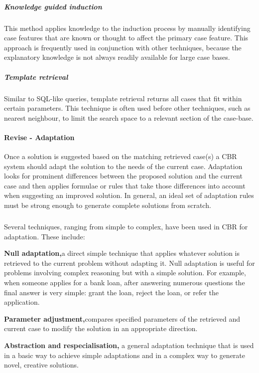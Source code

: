 \subparagraph{Knowledge guided induction}
\label{Knowledge guided induction} This method applies knowledge to the induction 
process by manually identifying case features that are known or thought to affect 
the primary case feature. This approach is frequently used in conjunction with other 
techniques, because the explanatory knowledge is not always readily available for large case bases.


\subparagraph{Template retrieval}
\label{template} Similar to SQL-like queries, template retrieval returns all 
cases that fit within certain parameters. This technique is often used before 
other techniques, such as nearest neighbour, to limit the search space to a 
relevant section of the case-base.

\paragraph{Revise - Adaptation}
\label{Revise} Once a solution is suggested based on the matching retrieved case(s) 
a CBR system should adapt the solution to the needs of the current case. Adaptation 
looks for prominent differences between the proposed solution and the current case and 
then applies formulae or rules that take those differences into account when 
suggesting an improved solution. In general, an ideal set of adaptation rules must be strong 
enough to generate complete solutions from scratch.

\subparagraph{}
Several techniques, ranging from simple to complex, have been used in CBR for adaptation. These include:

\textbf{Null adaptation,}a direct simple technique that applies whatever solution is retrieved to the current 
problem without adapting it. Null adaptation is useful for problems involving complex 
reasoning but with a simple solution. For example, when someone applies for a bank loan, 
after answering numerous questions the final answer is very simple: grant the loan, 
reject the loan, or refer the application.

\textbf{Parameter adjustment,}compares specified parameters of the retrieved 
and current case to modify the solution in an appropriate direction.

\textbf{Abstraction and respecialisation,}
a general adaptation technique that is used in a basic way to achieve simple 
adaptations and in a complex way to generate novel, creative solutions.

